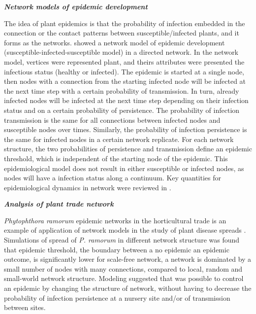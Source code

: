 \textit{\textbf{Network models of epidemic development}}

The idea of plant epidemics is that the probability of infection embedded in the connection or the contact patterns between susceptible/infected plants, and it forms as the networks.
 showed a network model of epidemic development (susceptible-infected-susceptible model) in a directed network. In the network model, vertices were represented plant, and theirs attributes were presented the infectious status (healthy or infected). The epidemic is started at a single node, then nodes with a connection from the starting infected node will be infected at the next time step with a certain probability of transmission. In turn, already infected nodes will be infected at the next time step depending on their infection status and on a certain probability of persistence. The probability of infection transmission is the same for all connections between infected nodes and susceptible nodes over times. Similarly, the probability of infection persistence is the same for infected nodes in a certain network replicate. For each network structure, the two probabilities of persistence and transmission define an epidemic threshold, which is independent of the starting node of the epidemic. This epidemiological model does not result in either susceptible or infected nodes, as nodes will have a infection status along a continuum. Key quantities for epidemiological dynamics in network were reviewed in .

\textit{\textbf{Analysis of plant trade network}}

\textit{Phytophthora ramorum} epidemic networks in the horticultural trade is an example of application of network models in the study of plant disease spreads . Simulations of spread of \textit{P. ramorum} in different network structure was found that epidemic threshold, the boundary between a no epidemic an epidemic outcome, is significantly lower for scale-free network, a network is dominated by a small number of nodes with many connections, compared to local, random and small-world network structure. Modeling suggested that was possible to control an epidemic by changing the structure of network, without having to decrease the probability of infection persistence at a nursery site and/or of transmission between sites.

